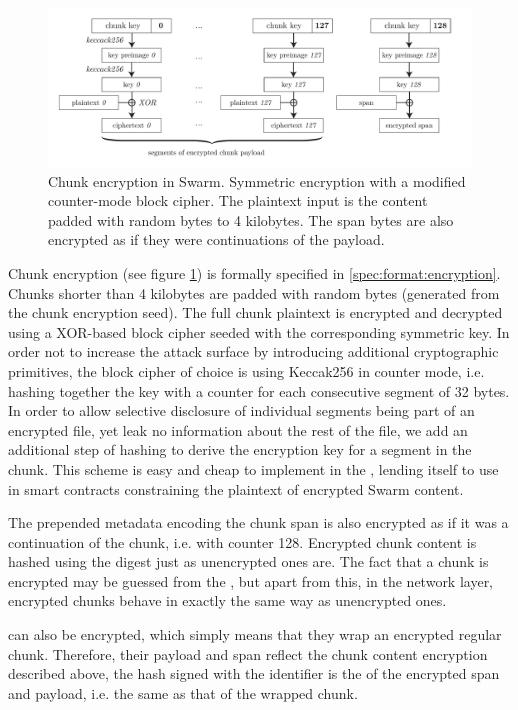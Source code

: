 \begin{figure}[htbp]
    \centering
    \includegraphics[width=\textwidth]{fig/chunk-encryption.pdf}
    \caption[Chunk encryption in Swarm \statusgreen]{Chunk encryption in Swarm. Symmetric encryption with a modified counter-mode block cipher. The plaintext input is the content padded with random bytes to 4 kilobytes. The span bytes are also encrypted as if they were continuations of the payload.}
    \label{fig:chunk-encryption}
\end{figure}


Chunk encryption (see figure \ref{fig:chunk-encryption}) is formally specified in \ref{spec:format:encryption}. Chunks shorter than 4 kilobytes are padded with random bytes (generated from the chunk encryption seed). The full chunk plaintext is encrypted and decrypted using a XOR-based block cipher seeded with the corresponding symmetric key. In order not to increase the attack surface by introducing additional cryptographic primitives, the block cipher of choice is using Keccak256 in counter mode, i.e. hashing together the key with a counter for each consecutive segment of 32 bytes. In order to allow selective disclosure of individual segments being part of an encrypted file, yet leak no information about the rest of the file, we add an additional step of hashing to derive the encryption key for a segment in the chunk. This scheme is easy and cheap to implement in the , lending itself to use in smart contracts constraining the plaintext of encrypted Swarm content. 

The prepended metadata encoding the chunk span is also encrypted as if it was a continuation of the chunk, i.e. with counter 128. Encrypted chunk content is hashed using the  digest just as unencrypted ones are. The fact that a chunk is encrypted may be guessed from the , but apart from this, in the network layer, encrypted chunks behave in exactly the same way as unencrypted ones.

 can also be encrypted, which simply means that they wrap an encrypted regular chunk. Therefore, their payload and span reflect the chunk content encryption described above, the hash signed with the identifier is the  of the encrypted span and payload, i.e. the same as that of the wrapped chunk.

